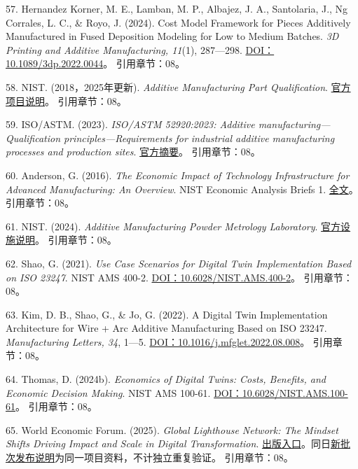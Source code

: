 \documentclass[UTF8,fontset=windows,12pt,a4paper,oneside,openany]{ctexbook}
\begin{document}
57. Hernandez Korner, M. E., Lamban, M. P., Albajez, J. A., Santolaria, J., Ng Corrales, L. C., \& Royo, J. (2024). Cost Model Framework for Pieces Additively Manufactured in Fused Deposition Modeling for Low to Medium Batches. \emph{3D Printing and Additive Manufacturing, 11}(1), 287—298. \href{https://doi.org/10.1089/3dp.2022.0044}{DOI：10.1089/3dp.2022.0044}。
引用章节：08。

58. NIST. (2018，2025年更新). \emph{Additive Manufacturing Part Qualification}. \href{https://www.nist.gov/programs-projects/additive-manufacturing-part-qualification}{官方项目说明}。
引用章节：08。

59. ISO/ASTM. (2023). \emph{ISO/ASTM 52920:2023: Additive manufacturing—Qualification principles—Requirements for industrial additive manufacturing processes and production sites}. \href{https://www.iso.org/standard/76911.html?browse=tc}{官方摘要}。
引用章节：08。

60. Anderson, G. (2016). \emph{The Economic Impact of Technology Infrastructure for Advanced Manufacturing: An Overview}. NIST Economic Analysis Briefs 1. \href{https://www.nist.gov/system/files/documents/2024/12/05/NIST.EAB_.1_R_1.pdf}{全文}。
引用章节：08。

61. NIST. (2024). \emph{Additive Manufacturing Powder Metrology Laboratory}. \href{https://www.nist.gov/laboratories/tools-instruments/additive-manufacturing-powder-metrology-laboratory}{官方设施说明}。
引用章节：08。

62. Shao, G. (2021). \emph{Use Case Scenarios for Digital Twin Implementation Based on ISO 23247}. NIST AMS 400-2. \href{https://doi.org/10.6028/NIST.AMS.400-2}{DOI：10.6028/NIST.AMS.400-2}。
引用章节：08。

63. Kim, D. B., Shao, G., \& Jo, G. (2022). A Digital Twin Implementation Architecture for Wire + Arc Additive Manufacturing Based on ISO 23247. \emph{Manufacturing Letters, 34}, 1—5. \href{https://doi.org/10.1016/j.mfglet.2022.08.008}{DOI：10.1016/j.mfglet.2022.08.008}。
引用章节：08。

64. Thomas, D. (2024b). \emph{Economics of Digital Twins: Costs, Benefits, and Economic Decision Making}. NIST AMS 100-61. \href{https://doi.org/10.6028/NIST.AMS.100-61}{DOI：10.6028/NIST.AMS.100-61}。
引用章节：08。

65. World Economic Forum. (2025). \emph{Global Lighthouse Network: The Mindset Shifts Driving Impact and Scale in Digital Transformation}. \href{https://www.weforum.org/publications/global-lighthouse-network-the-mindset-shifts-driving-impact-and-scale-in-digital-transformation/}{出版入口}。同日\href{https://www.weforum.org/press/2025/01/global-lighthouse-network-2025-world-economic-forum-recognizes-companies-transforming-manufacturing-through-innovation/}{新批次发布说明}为同一项目资料，不计独立重复验证。
引用章节：08。
\end{document}
